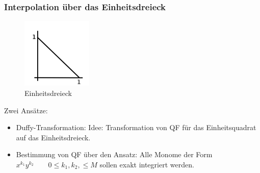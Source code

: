 \subsubsection{Interpolation über das Einheitsdreieck}
\begin{figure}[htbp]
  \centering
  \includegraphics[width=0.3\textwidth]{figures/einheitsdreieck.png}
  \caption{Einheitsdreieck}
\end{figure}
Zwei Ansätze:
\begin{itemize}
  \item Duffy-Transformation: Idee: Transformation von QF für das Einheitsquadrat auf das Einheitsdreieck.
  \item Bestimmung von QF über den Ansatz: Alle Monome der Form $x^{k_1}y^{k_2} \qquad 0 \leq k_1, k_2, \leq M$
    sollen exakt integriert werden.
\end{itemize}
